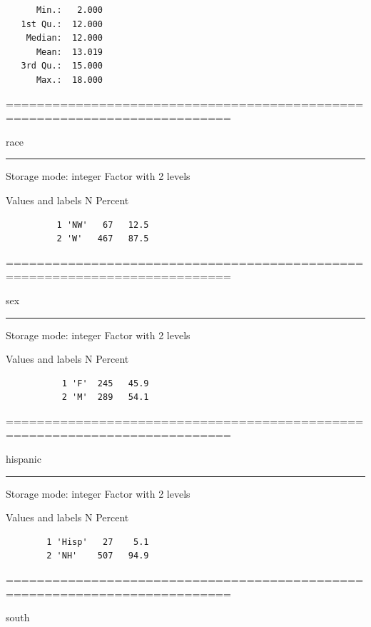 \documentclass[]{article}
\begin{document}
\begin{verbatim}
      Min.:   2.000
   1st Qu.:  12.000
    Median:  12.000
      Mean:  13.019
   3rd Qu.:  15.000
      Max.:  18.000
\end{verbatim}

===========================================================================

race

\begin{center}\rule{0.5\linewidth}{\linethickness}\end{center}

Storage mode: integer Factor with 2 levels

Values and labels N Percent

\begin{verbatim}
          1 'NW'   67   12.5     
          2 'W'   467   87.5     
\end{verbatim}

===========================================================================

sex

\begin{center}\rule{0.5\linewidth}{\linethickness}\end{center}

Storage mode: integer Factor with 2 levels

Values and labels N Percent

\begin{verbatim}
           1 'F'  245   45.9     
           2 'M'  289   54.1     
\end{verbatim}

===========================================================================

hispanic

\begin{center}\rule{0.5\linewidth}{\linethickness}\end{center}

Storage mode: integer Factor with 2 levels

Values and labels N Percent

\begin{verbatim}
        1 'Hisp'   27    5.1     
        2 'NH'    507   94.9     
\end{verbatim}

===========================================================================

south
\end{document}
